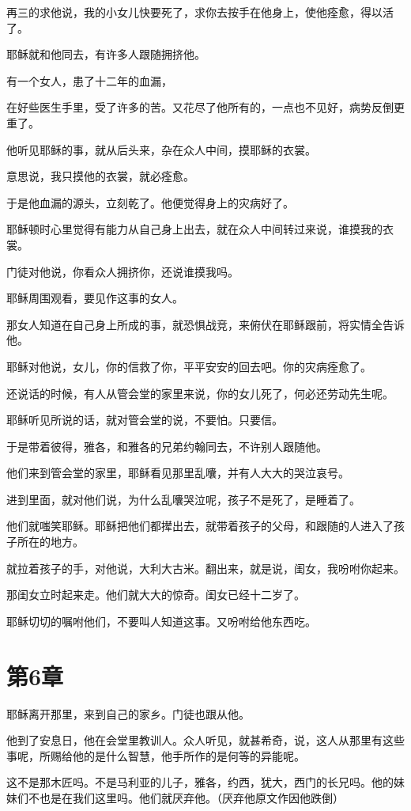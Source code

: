\documentclass[12pt,oneside]{book}
\begin{document}
再三的求他说，我的小女儿快要死了，求你去按手在他身上，使他痊愈，得以活了。

耶稣就和他同去，有许多人跟随拥挤他。

有一个女人，患了十二年的血漏，

在好些医生手里，受了许多的苦。又花尽了他所有的，一点也不见好，病势反倒更重了。

他听见耶稣的事，就从后头来，杂在众人中间，摸耶稣的衣裳。

意思说，我只摸他的衣裳，就必痊愈。

于是他血漏的源头，立刻乾了。他便觉得身上的灾病好了。

耶稣顿时心里觉得有能力从自己身上出去，就在众人中间转过来说，谁摸我的衣裳。

门徒对他说，你看众人拥挤你，还说谁摸我吗。

耶稣周围观看，要见作这事的女人。

那女人知道在自己身上所成的事，就恐惧战竞，来俯伏在耶稣跟前，将实情全告诉他。

耶稣对他说，女儿，你的信救了你，平平安安的回去吧。你的灾病痊愈了。

还说话的时候，有人从管会堂的家里来说，你的女儿死了，何必还劳动先生呢。

耶稣听见所说的话，就对管会堂的说，不要怕。只要信。

于是带着彼得，雅各，和雅各的兄弟约翰同去，不许别人跟随他。

他们来到管会堂的家里，耶稣看见那里乱囔，并有人大大的哭泣哀号。

进到里面，就对他们说，为什么乱囔哭泣呢，孩子不是死了，是睡着了。

他们就嗤笑耶稣。耶稣把他们都撵出去，就带着孩子的父母，和跟随的人进入了孩子所在的地方。

就拉着孩子的手，对他说，大利大古米。翻出来，就是说，闺女，我吩咐你起来。

那闺女立时起来走。他们就大大的惊奇。闺女已经十二岁了。

耶稣切切的嘱咐他们，不要叫人知道这事。又吩咐给他东西吃。

\chapter{第6章}
耶稣离开那里，来到自己的家乡。门徒也跟从他。

他到了安息日，他在会堂里教训人。众人听见，就甚希奇，说，这人从那里有这些事呢，所赐给他的是什么智慧，他手所作的是何等的异能呢。

这不是那木匠吗。不是马利亚的儿子，雅各，约西，犹大，西门的长兄吗。他的妹妹们不也是在我们这里吗。他们就厌弃他。（厌弃他原文作因他跌倒）
\end{document}
